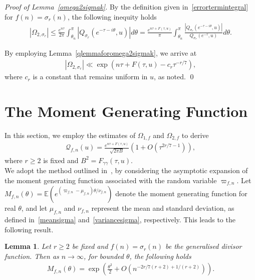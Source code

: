 \documentclass[12pt, oneside,reqno]{amsart}
\numberwithin{equation}{section}
\newtheorem{lemma}[theorem]{Lemma}
\begin{document}
\medskip
\noindent
{\it Proof of Lemma~\ref{omega2sigmak}.} By the definition given in~\eqref{errortermintegral} for $f(n)=\sigma_r(n)$, the following inequity holds
\begin{align*}
|\Omega_{2,\sigma_r}|
\leq\frac{e^{n\tau}}{2\pi}\int_{\theta_n}^{\pi}\left|{Q}_{\sigma_r}(e^{-\tau-i\theta},u)\right|d\theta 
=\frac{e^{n\tau+F(\tau,u)}}{\pi}\int_{\theta_n}^{\pi}\frac{|Q_{\sigma_r}(e^{-\tau-i\theta},u)|}{Q_{\sigma_r}(e^{-\tau},u)}d\theta.
\end{align*}

\noindent
By employing Lemma~\ref{qlemmaforomega2sigmak}, we arrive at
\begin{align*}
|\Omega_{2,\sigma_r}|
\ll\exp\left(n\tau+F(\tau,u)-c_{r}\tau^{-r/7}\right),
\end{align*}
where $c_{r}$ is a constant that remains uniform in $u$, as noted.
\qed





\section{The Moment Generating Function}

In this section, we employ the estimates of $\Omega_{1,f}$ and $\Omega_{2,f}$ to derive
\begin{align*}
\mathcal{Q}_{f,n}(u)
=\frac{e^{n\tau+F(\tau,u)}}{\sqrt{2\pi B}}\left(1+O\left(\tau^{2r/7-1}\right)\right),
\end{align*}
where $r\geq 2$ is fixed and $B^2=F_{\gamma\gamma}(\tau,u)$. \\

We adopt the method outlined in~\cite[\S4.3]{lipniketal}, by considering the asymptotic expansion of the moment generating function associated with the random variable ${\varpi}_{f,n}$. Let $M_{f,n}(\theta)=\mathbb{E}(e^{(\varpi_{f,n}-\mu_{f,n})\theta/\nu_{f,n}})$ denote the moment generating function for real $\theta$, and let $\mu_{f,n}$ and $\nu_{f,n}$ represent the mean and standard deviation, as defined in~\eqref{meansigma} and~\eqref{variancesigma}, respectively. This leads to the following result.



\begin{lemma}\label{momentgeneratingfunctionlemma}
Let $r\geq 2$ be fixed and $f(n)=\sigma_r(n)$ be the generalised divisor function. Then as $n\to\infty$, for bounded $\theta$, the following holds
\begin{align*}
M_{f,n}(\theta)
=\exp\left(\frac{\theta^2}{2}+O\left(n^{-2r/7(r+2)+1/(r+2)}\right)\right).
\end{align*}
\end{lemma}
\end{document}
